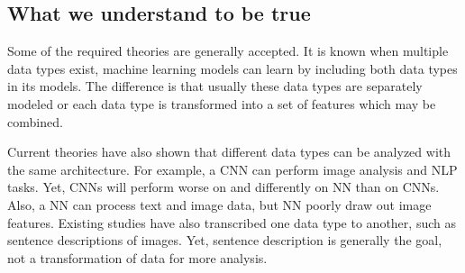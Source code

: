 \subsection{What we understand to be true}

Some of the required theories are generally accepted. It is known when multiple data types exist, machine learning models can learn by including both data types in its models.  The difference is that usually these data types are separately modeled or each data type is transformed into a set of features which may be combined.  

Current theories have also shown that different data types can be analyzed with the same architecture.  For example, a CNN can perform image analysis and NLP tasks.  Yet, CNNs will perform worse on and differently on NN than on CNNs.  Also, a NN can process text and image data, but NN poorly draw out image features.  Existing studies have also transcribed one data type to another, such as sentence descriptions of images.  Yet, sentence description is generally the goal, not a transformation of data for more analysis. 
